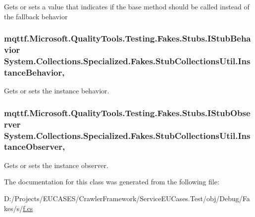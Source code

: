 Gets or sets a value that indicates if the base method should be called instead of the fallback behavior

\hypertarget{class_system_1_1_collections_1_1_specialized_1_1_fakes_1_1_stub_collections_util_ac79be48775cee5080d952792e26bc4e8}{
\subsubsection[{Instance\-Behavior}]{\setlength{\rightskip}{0pt plus 5cm}mqttf.\-Microsoft.\-Quality\-Tools.\-Testing.\-Fakes.\-Stubs.\-I\-Stub\-Behavior System.\-Collections.\-Specialized.\-Fakes.\-Stub\-Collections\-Util.\-Instance\-Behavior\hspace{0.3cm}{\ttfamily [get]}, {\ttfamily [set]}}}\label{class_system_1_1_collections_1_1_specialized_1_1_fakes_1_1_stub_collections_util_ac79be48775cee5080d952792e26bc4e8}


Gets or sets the instance behavior.

\hypertarget{class_system_1_1_collections_1_1_specialized_1_1_fakes_1_1_stub_collections_util_a8ed6ec12c91ce2a05a084ab2215e4010}{
\subsubsection[{Instance\-Observer}]{\setlength{\rightskip}{0pt plus 5cm}mqttf.\-Microsoft.\-Quality\-Tools.\-Testing.\-Fakes.\-Stubs.\-I\-Stub\-Observer System.\-Collections.\-Specialized.\-Fakes.\-Stub\-Collections\-Util.\-Instance\-Observer\hspace{0.3cm}{\ttfamily [get]}, {\ttfamily [set]}}}\label{class_system_1_1_collections_1_1_specialized_1_1_fakes_1_1_stub_collections_util_a8ed6ec12c91ce2a05a084ab2215e4010}


Gets or sets the instance observer.



The documentation for this class was generated from the following file\-:\begin{DoxyCompactItemize}
\item 
D\-:/\-Projects/\-E\-U\-C\-A\-S\-E\-S/\-Crawler\-Framework/\-Service\-E\-U\-Cases.\-Test/obj/\-Debug/\-Fakes/s/\hyperlink{s_2f_8cs}{f.\-cs}\end{DoxyCompactItemize}

